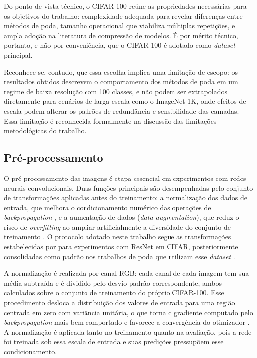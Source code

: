 Do ponto de vista técnico, o CIFAR-100 reúne as propriedades necessárias para os objetivos do trabalho: complexidade adequada para revelar diferenças entre métodos de poda, tamanho operacional que viabiliza múltiplas repetições, e ampla adoção na literatura de compressão de modelos. É por mérito técnico, portanto, e não por conveniência, que o CIFAR-100 é adotado como \textit{dataset} principal.

Reconhece-se, contudo, que essa escolha implica uma limitação de escopo: os resultados obtidos descrevem o comportamento dos métodos de poda em um regime de baixa resolução com 100 classes, e não podem ser extrapolados diretamente para cenários de larga escala como o ImageNet-1K, onde efeitos de escala podem alterar os padrões de redundância e sensibilidade das camadas. Essa limitação é reconhecida formalmente na discussão das limitações metodológicas do trabalho.

\subsection{Pré-processamento}\label{subsec:preprocessamento}

O pré-processamento das imagens é etapa essencial em experimentos com redes neurais convolucionais. Duas funções principais são desempenhadas pelo conjunto de transformações aplicadas antes do treinamento: a normalização dos dados de entrada, que melhora o condicionamento numérico das operações de \textit{backpropagation} \cite{Goodfellow2016}, e a aumentação de dados (\textit{data augmentation}), que reduz o risco de \textit{overfitting} ao ampliar artificialmente a diversidade do conjunto de treinamento \cite{Goodfellow2016}. O protocolo adotado neste trabalho segue as transformações estabelecidas por  para experimentos com ResNet em CIFAR, posteriormente consolidadas como padrão nos trabalhos de poda que utilizam esse \textit{dataset} \cite{Li2017}.

A normalização é realizada por canal RGB: cada canal de cada imagem tem sua média subtraída e é dividido pelo desvio-padrão correspondente, ambos calculados sobre o conjunto de treinamento do próprio CIFAR-100. Esse procedimento desloca a distribuição dos valores de entrada para uma região centrada em zero com variância unitária, o que torna o gradiente computado pelo \textit{backpropagation} mais bem-comportado e favorece a convergência do otimizador \cite{Goodfellow2016}. A normalização é aplicada tanto no treinamento quanto na avaliação, pois a rede foi treinada sob essa escala de entrada e suas predições pressupõem esse condicionamento.

